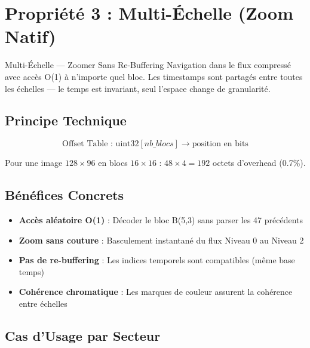 \documentclass[12pt,a4paper]{article}
\begin{document}
	\section{Propriété 3 : Multi-Échelle (Zoom Natif)}
	
	\begin{featurebox}{Multi-Échelle — Zoomer Sans Re-Buffering}
		Navigation dans le flux compressé avec accès O(1) à n'importe quel bloc. Les timestamps sont partagés entre toutes les échelles — le temps est invariant, seul l'espace change de granularité.
	\end{featurebox}
	
	\subsection{Principe Technique}
	
	\begin{equation}
		\text{Offset Table : } \text{uint32}[nb\_blocs] \rightarrow \text{position en bits}
	\end{equation}
	
	Pour une image $128 \times 96$ en blocs $16 \times 16$ : $48 \times 4 = 192$ octets d'overhead (0.7\%).
	
	\subsection{Bénéfices Concrets}
	
	\begin{benefitbox}
		\begin{itemize}[leftmargin=*]
			\item \textbf{Accès aléatoire O(1)} : Décoder le bloc B(5,3) sans parser les 47 précédents
			\item \textbf{Zoom sans couture} : Basculement instantané du flux Niveau 0 au Niveau 2
			\item \textbf{Pas de re-buffering} : Les indices temporels sont compatibles (même base temps)
			\item \textbf{Cohérence chromatique} : Les marques de couleur assurent la cohérence entre échelles
		\end{itemize}
	\end{benefitbox}
	
	\subsection{Cas d'Usage par Secteur}
	
\end{document}
